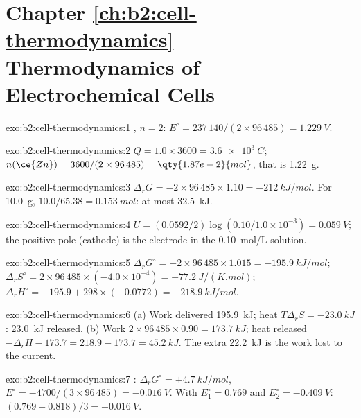 \section*{Chapter \ref{ch:b2:cell-thermodynamics} --- Thermodynamics of Electrochemical Cells}

\begin{solution}{exo:b2:cell-thermodynamics:1}
, $n = 2$: $E^\circ = 237\,140/(2 \times 96\,485) =
\qty{1.229}{V}$.
\end{solution}

\begin{solution}{exo:b2:cell-thermodynamics:2}
$Q = 1.0 \times 3600 = \qty{3.6e3}{C}$; $n(\ce{Zn}) = 3600/(2 \times 96\,485) =
\qty{1.87e-2}{mol}$, that is \qty{1.22}{g}.
\end{solution}

\begin{solution}{exo:b2:cell-thermodynamics:3}
$\Delta_r G = -2 \times 96\,485 \times 1.10 = \qty{-212}{kJ/mol}$. For
\qty{10.0}{g}, $10.0/65.38 = \qty{0.153}{mol}$: at most \qty{32.5}{kJ}.
\end{solution}

\begin{solution}{exo:b2:cell-thermodynamics:4}
$U = (0.0592/2)\log(0.10/1.0 \times 10^{-3}) = \qty{0.059}{V}$; the positive pole
(cathode) is the electrode in the \qty{0.10}{mol/L} solution.
\end{solution}

\begin{solution}{exo:b2:cell-thermodynamics:5}
$\Delta_r G^\circ = -2 \times 96\,485 \times 1.015 = \qty{-195.9}{kJ/mol}$;
$\Delta_r S^\circ = 2 \times 96\,485 \times (-4.0 \times 10^{-4}) =
\qty{-77.2}{J/(K.mol)}$; $\Delta_r H^\circ = -195.9 + 298 \times (-0.0772) =
\qty{-218.9}{kJ/mol}$.
\end{solution}

\begin{solution}{exo:b2:cell-thermodynamics:6}
(a) Work delivered \qty{195.9}{kJ}; heat $T\Delta_r S = \qty{-23.0}{kJ}$: \qty{23.0}{kJ}
released. (b) Work $2 \times 96\,485 \times 0.90 = \qty{173.7}{kJ}$; heat released
$-\Delta_r H - 173.7 = 218.9 - 173.7 = \qty{45.2}{kJ}$. The extra
\qty{22.2}{kJ} is the work lost to the current.
\end{solution}

\begin{solution}{exo:b2:cell-thermodynamics:7}
: $\Delta_r G^\circ = +\qty{4.7}{kJ/mol}$, $E^\circ =
-4700/(3 \times 96\,485) = \qty{-0.016}{V}$. With $E_1^\circ = 0.769$ and
$E_2^\circ = \qty{-0.409}{V}$: $(0.769 - 0.818)/3 = \qty{-0.016}{V}$.
\end{solution}

